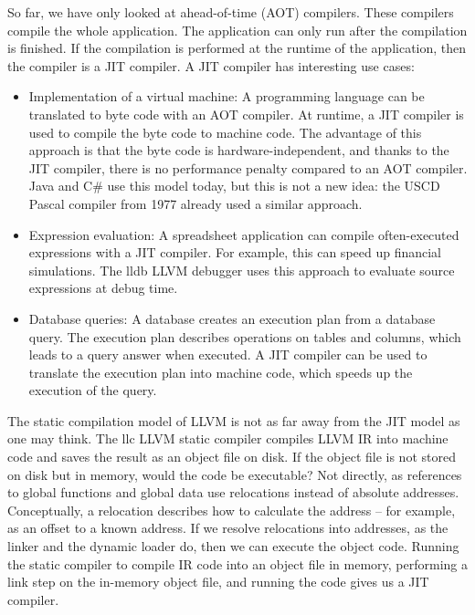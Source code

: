 
So far, we have only looked at ahead-of-time (AOT) compilers. These compilers compile the whole application. The application can only run after the compilation is finished. If the compilation is performed at the runtime of the application, then the compiler is a JIT compiler. A JIT compiler has interesting use cases:

\begin{itemize}
\item
Implementation of a virtual machine: A programming language can be translated to byte code with an AOT compiler. At runtime, a JIT compiler is used to compile the byte code to machine code. The advantage of this approach is that the byte code is hardware-independent, and thanks to the JIT compiler, there is no performance penalty compared to an AOT compiler. Java and C\# use this model today, but this is not a new idea: the USCD Pascal compiler from 1977 already used a similar approach.

\item
Expression evaluation: A spreadsheet application can compile often-executed expressions with a JIT compiler. For example, this can speed up financial simulations. The lldb LLVM debugger uses this approach to evaluate source expressions at debug time.

\item
Database queries: A database creates an execution plan from a database query. The execution plan describes operations on tables and columns, which leads to a query answer when executed. A JIT compiler can be used to translate the execution plan into machine code, which speeds up the execution of the query.
\end{itemize}

The static compilation model of LLVM is not as far away from the JIT model as one may think. The llc LLVM static compiler compiles LLVM IR into machine code and saves the result as an object file on disk. If the object file is not stored on disk but in memory, would the code be executable? Not directly, as references to global functions and global data use relocations instead of absolute addresses. Conceptually, a relocation describes how to calculate the address – for example, as an offset to a known address. If we resolve relocations into addresses, as the linker and the dynamic loader do, then we can execute the object code. Running the static compiler to compile IR code into an object file in memory, performing a link step on the in-memory object file, and running the code gives us a JIT compiler.

